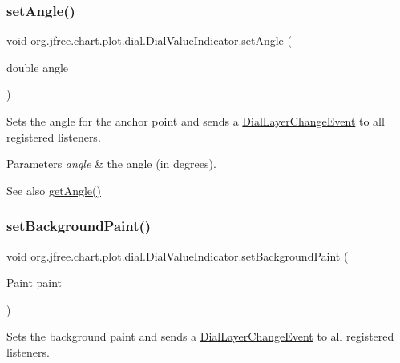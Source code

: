 \subsubsection{\texorpdfstring{set\+Angle()}{setAngle()}}
{\footnotesize\ttfamily void org.\+jfree.\+chart.\+plot.\+dial.\+Dial\+Value\+Indicator.\+set\+Angle (\begin{DoxyParamCaption}\item[{double}]{angle }\end{DoxyParamCaption})}

Sets the angle for the anchor point and sends a \mbox{\hyperlink{classorg_1_1jfree_1_1chart_1_1plot_1_1dial_1_1_dial_layer_change_event}{Dial\+Layer\+Change\+Event}} to all registered listeners.


\begin{DoxyParams}{Parameters}
{\em angle} & the angle (in degrees).\\
\hline
\end{DoxyParams}
\begin{DoxySeeAlso}{See also}
\mbox{\hyperlink{classorg_1_1jfree_1_1chart_1_1plot_1_1dial_1_1_dial_value_indicator_a46cace0b19e63ed86380fd39d767fcc0}{get\+Angle()}} 
\end{DoxySeeAlso}
\mbox{\label{classorg_1_1jfree_1_1chart_1_1plot_1_1dial_1_1_dial_value_indicator_a4dae61c463927eda13f4c4ac7dbcc93d}} 
\subsubsection{\texorpdfstring{set\+Background\+Paint()}{setBackgroundPaint()}}
{\footnotesize\ttfamily void org.\+jfree.\+chart.\+plot.\+dial.\+Dial\+Value\+Indicator.\+set\+Background\+Paint (\begin{DoxyParamCaption}\item[{Paint}]{paint }\end{DoxyParamCaption})}

Sets the background paint and sends a \mbox{\hyperlink{classorg_1_1jfree_1_1chart_1_1plot_1_1dial_1_1_dial_layer_change_event}{Dial\+Layer\+Change\+Event}} to all registered listeners.


